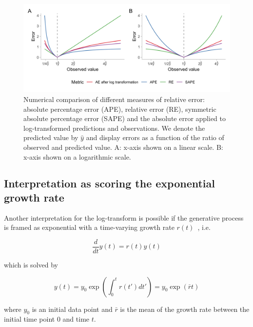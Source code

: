 \documentclass{article}
\begin{document}
\begin{figure}[h!]
\centering
\includegraphics[width = 1\textwidth]{output/figures/different-relative-errors.png}
\caption{Numerical comparison of different measures of relative error: absolute percentage error (APE), relative error (RE), symmetric absolute percentage error (SAPE) and the absolute error applied to log-transformed predictions and observations. We denote the predicted value by $\hat{y}$ and display errors as a function of the ratio of observed and predicted value. A: x-axis shown on a linear scale. B: x-axis shown on a logarithmic scale.}
\label{fig:SAPE}
\end{figure}





\subsection{Interpretation as scoring the exponential growth rate}
\label{sec:methods:growthrate}

Another interpretation for the log-transform is possible if the generative process is framed as exponential with a time-varying growth rate $r(t)$~\citep[see, e.g.,][]{wallingaHowGenerationIntervals2007}, i.e.
\begin{linenomath*}
\begin{equation*}
\frac{d}{dt}y(t) = r(t)y(t)
\end{equation*}
\end{linenomath*}
%
which is solved by
%
\begin{linenomath*}
\begin{equation*}
y(t) = y_0 \exp \left( \int_0^t r(t') dt' \right) = y_0 \exp (\bar{r}t)
\end{equation*}
\end{linenomath*}
where $y_0$ is an initial data point and $\bar{r}$ is the mean of the growth rate between the initial time point $0$ and time $t$.
\end{document}
